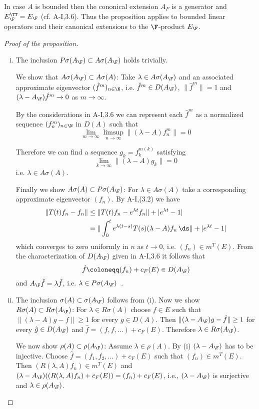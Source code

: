 \begin{remark}
In case $A$ is bounded then the cononical extension $A_F$ is a generator and $E_{\F}^{\TT} = E_{\F}$ (cf. A-I,3.6).
Thus the proposition applies to bounded linear operators and their canonical extensions to the $\F$-product $E_{\F}$.
\end{remark}

\begin{proof}[Proof of the proposition]
\begin{enumerate}[(i), wide]
\item The inclusion $P\sigma(A_{\F}) \subset A\sigma(A_{\F})$ holds trivially.

We show that $A\sigma(A_{\F}) \subset A\sigma(A)$: Take $\lambda \in A\sigma(A_{\F})$ and an associated approximate eigenvector $({\hat{f}^{m}})_{n \in \N}$, i.e. $\hat{f}^{m} \in D(A_{\F})$, $\|\hat{f}^{m}\| = 1$ and $(\lambda-A_{\F})\hat{f}^{m} \to 0$ as $m \to \infty$.

By the considerations in A-I,3.6 we can represent each $\hat{f}^{m}$ as a normalized sequence $(f_{n}^{m})_{n \in \N}$ in $D(A)$ such that
\[
\lim_{m \to \infty} \limsup_{n \to \infty} \|(\lambda-A)f_{n}^{m}\| = 0
\]

Therefore we can find a sequence $g_{k} = f_{k}^{m(k)}$ satisfying
\[
\lim_{k \to \infty} \|(\lambda-A)g_{k}\| = 0
\]
i.e. $\lambda \in A\sigma(A)$.

Finally we show $A\sigma(A) \subset P\sigma(A_{\F})$: For $\lambda \in A\sigma(A)$ take a corresponding approximate eigenvector $(f_{n})$.
By A-I,(3.2) we have
\begin{align*}
\|T(t)f_{n} - f_{n}\| &\leq \|T(t)f_{n} - e^{\lambda t}f_{n}\| + |e^{\lambda t} - 1| \\
&= \|\int_{0}^{t} e^{\lambda(t-s)}T(s)(\lambda-A)f_{n} \, \ds\| + |e^{\lambda t} -1|
\end{align*}
which converges to zero uniformly in $n$ as $t \to 0$, i.e. $(f_{n}) \in m^{T}(E)$.
From the characterization of $D(A_{\F})$ given in A-I,3.6 it follows that
\[
\hat{f} \coloneqq (f_{n}) + c_{F}(E) \in D(A_{\F})
\]
and $A_{\F}\hat{f} = \lambda\hat{f}$, i.e. $\lambda \in P\sigma(A_{\F})$~.

\item The inclusion $\sigma(A) \subset \sigma(A_{\F})$ follows from (i). Now we show $R\sigma(A) \subset R\sigma(A_{\F})$:
For $\lambda \in R\sigma(A)$ choose $f \in E$ such that $\|(\lambda-A)g - f\| \geq 1$ for every $g \in D(A)$.
Then $\|(\lambda-A_{\F})g - \hat{f}\| \geq 1$ for every $\hat{g} \in D(A_{\F})$ and $\hat{f} = (f,f,\ldots) + c_{F}(E)$.
Therefore $\lambda \in R\sigma(A_{\F})$.

We now show $\rho(A) \subset \rho(A_{\F})$: Assume $\lambda \in \rho(A)$.
By (i) $(\lambda-A_{\F})$ has to be injective.
Choose $\hat{f} = (f_{1},f_{2},\ldots) + c_{F}(E)$ such that $(f_{n}) \in m^{T}(E)$.
Then $(R(\lambda,A)f_{n}) \in m^{T}(E)$ and $(\lambda-A_{\F})((R(\lambda,A)f_{n})+c_{F}(E)) = (f_{n}) + c_{F}(E)$, i.e., $(\lambda-A_{\F})$ is surjective and $\lambda \in \rho(A_{\F})$.
\end{enumerate}
\end{proof}
